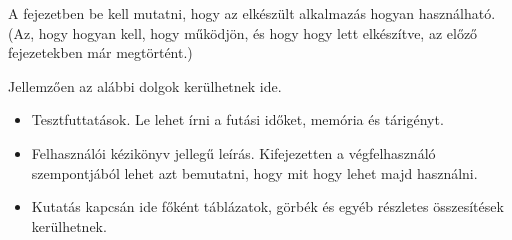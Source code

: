 

A fejezetben be kell mutatni, hogy az elkészült alkalmazás hogyan használható.
(Az, hogy hogyan kell, hogy működjön, és hogy hogy lett elkészítve, az előző fejezetekben már megtörtént.)

Jellemzően az alábbi dolgok kerülhetnek ide.
\begin{itemize}
	\item Tesztfuttatások. Le lehet írni a futási időket, memória és tárigényt.
	\item Felhasználói kézikönyv jellegű leírás. Kifejezetten a végfelhasználó szempontjából lehet azt bemutatni, hogy mit hogy lehet majd használni.
	\item Kutatás kapcsán ide főként táblázatok, görbék és egyéb részletes összesítések kerülhetnek.
\end{itemize}